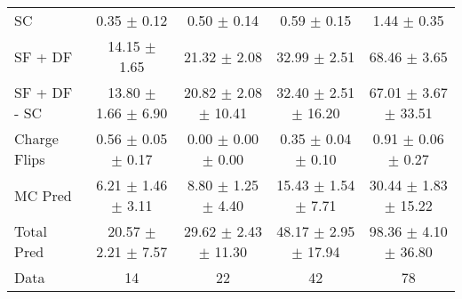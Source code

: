 \begin{tabular}{l|cccc}
                                 SC &  0.35 $\pm$  0.12 &  0.50 $\pm$  0.14 &  0.59 $\pm$  0.15 &  1.44 $\pm$  0.35 \\
                            SF + DF & 14.15 $\pm$  1.65 & 21.32 $\pm$  2.08 & 32.99 $\pm$  2.51 & 68.46 $\pm$  3.65 \\
\hline
                       SF + DF - SC & 13.80 $\pm$  1.66 $\pm$  6.90 & 20.82 $\pm$  2.08 $\pm$ 10.41 & 32.40 $\pm$  2.51 $\pm$ 16.20 & 67.01 $\pm$  3.67 $\pm$ 33.51 \\
\hline\hline
                       Charge Flips &  0.56 $\pm$  0.05 $\pm$  0.17 &  0.00 $\pm$  0.00 $\pm$  0.00 &  0.35 $\pm$  0.04 $\pm$  0.10 &  0.91 $\pm$  0.06 $\pm$  0.27 \\
\hline
                            MC Pred &  6.21 $\pm$  1.46 $\pm$  3.11 &  8.80 $\pm$  1.25 $\pm$  4.40 & 15.43 $\pm$  1.54 $\pm$  7.71 & 30.44 $\pm$  1.83 $\pm$ 15.22 \\
\hline
                         Total Pred & 20.57 $\pm$  2.21 $\pm$  7.57 & 29.62 $\pm$  2.43 $\pm$ 11.30 & 48.17 $\pm$  2.95 $\pm$ 17.94 & 98.36 $\pm$  4.10 $\pm$ 36.80 \\
\hline\hline
                               Data &    14 &    22 &    42 &    78 \\
\hline\hline
\end{tabular}

